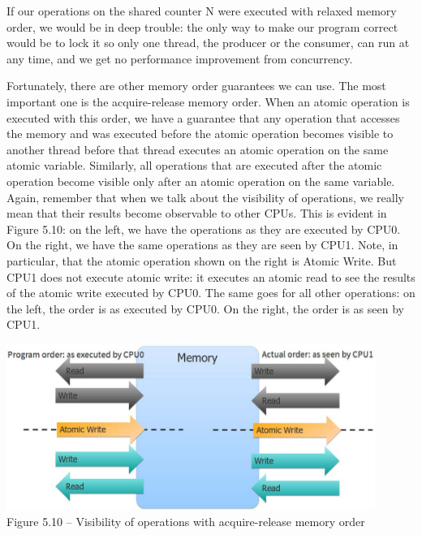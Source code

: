 If our operations on the shared counter N were executed with relaxed memory order, we would be in deep trouble: the only way to make our program correct would be to lock it so only one thread, the producer or the consumer, can run at any time, and we get no performance improvement from concurrency.

Fortunately, there are other memory order guarantees we can use. The most important one is the acquire-release memory order. When an atomic operation is executed with this order, we have a guarantee that any operation that accesses the memory and was executed before the atomic operation becomes visible to another thread before that thread executes an atomic operation on the same atomic variable. Similarly, all operations that are executed after the atomic operation become visible only after an atomic operation on the same variable. Again, remember that when we talk about the visibility of operations, we really mean that their results become observable to other CPUs. This is evident in Figure 5.10: on the left, we have the operations as they are executed by CPU0. On the right, we have the same operations as they are seen by CPU1. Note, in particular, that the atomic operation shown on the right is Atomic Write. But CPU1 does not execute atomic write: it executes an atomic read to see the results of the atomic write executed by CPU0. The same goes for all other operations: on the left, the order is as executed by CPU0. On the right, the order is as seen by CPU1.

\begin{center}
\includegraphics[width=0.9\textwidth]{content/1/chapter5/images/10.jpg}\\
Figure 5.10 – Visibility of operations with acquire-release memory order
\end{center}


